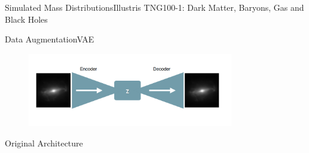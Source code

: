 \documentclass{beamer}
\begin{document}
{ %
        \begin{frame}[plain]{Simulated Mass Distributions}{Illustris TNG100-1: Dark Matter, Baryons, Gas and Black Holes}
     \end{frame}
}

\begin{frame}{Data Augmentation}{VAE}
        \begin{figure}[H]
                \centering
                \includegraphics[width=0.8\textwidth]{figures/vae}
        \end{figure}
        
\end{frame}


\begin{frame}{Original Architecture}{}
\begin{figure}[H]
        
\end{figure}
\end{frame}
\end{document}
